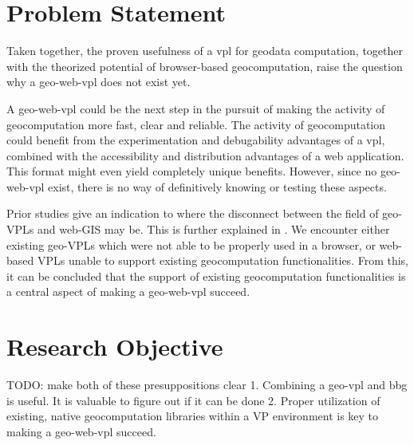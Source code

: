 

\section{Problem Statement}
Taken together, the proven usefulness of a vpl for geodata computation, together with the theorized potential of browser-based geocomputation, raise the question why a \ac{geo-web-vpl} does not exist yet.

A \ac{geo-web-vpl} could be the next step in the pursuit of making the activity of geocomputation more fast, clear and reliable.
The activity of geocomputation could benefit from the experimentation and debugability advantages of a \ac{vpl}, combined with the accessibility and distribution advantages of a web application. 
This format might even yield completely unique benefits.
However, since no geo-web-vpl exist, there is no way of definitively knowing or testing these aspects. 

Prior studies give an indication to where the disconnect between the field of geo-VPLs and web-GIS may be. This is further explained in .
We encounter either existing geo-VPLs which were not able to be properly used in a browser, or web-based VPLs unable to support existing geocomputation functionalities. From this, it can be concluded that the support of existing geocomputation functionalities is a central aspect of making a geo-web-vpl succeed. 


\section{Research Objective}

\begin{note}
TODO: make both of these presuppositions clear
1. Combining a geo-vpl and bbg is useful. It is valuable to figure out if it can be done
2. Proper utilization of existing, native geocomputation libraries within a VP environment is key to making a geo-web-vpl succeed. 
\end{note}

